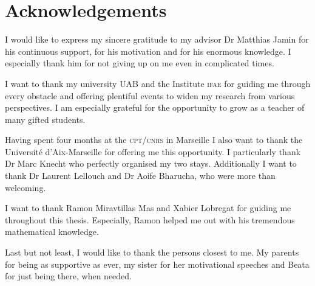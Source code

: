 \documentclass[../../index.tex]{subfiles}
\begin{document}
\chapter*{Acknowledgements}
I would like to express my sincere gratitude to my advisor Dr Matthias Jamin for
his continuous support, for his motivation and for his enormous knowledge. I
especially thank him for not giving up on me even in complicated times.

I want to thank my university \textsc{UAB} and the Institute \textsc{ifae} for
guiding me through every obstacle and offering plentiful events to widen my
research from various perspectives. I am especially grateful for the opportunity
to grow as a teacher of many gifted students.

Having spent four months at the \textsc{cpt}/\textsc{cnrs} in Marseille I also
want to thank the Université d'Aix-Marseille for offering me this opportunity. I
particularly thank Dr Marc Knecht who perfectly organised my two stays.
Additionally I want to thank Dr Laurent Lellouch and Dr Aoife Bharucha, who were
more than welcoming.

I want to thank Ramon Miravtillas Mas and Xabier Lobregat for guiding me
throughout this thesis. Especially, Ramon helped me out with his tremendous
mathematical knowledge.

Last but not least, I would like to thank the persons closest to me. My parents
for being as supportive as ever, my sister for her motivational speeches and
Beata for just being there, when needed.
\end{document}
